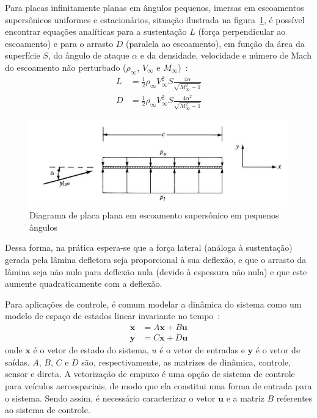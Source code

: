 Para placas infinitamente planas em ângulos pequenos, imersas em escoamentos supersônicos uniformes e estacionários, situação ilustrada na figura~\ref{fig:supersonic_flat_plate}, é possível encontrar equações analíticas para a sustentação \(L\) (força perpendicular ao escoamento) e para o arrasto \(D\) (paralela ao escoamento), em função da área da superfície \(S\), do ângulo de ataque \(\alpha \) e da densidade, velocidade e número de Mach do escoamento não perturbado (\(\rho_\infty \), \(V_\infty \) e \(M_\infty \))~\cite{anderson}:
\begin{align}
    L &= \frac{1}{2} \rho_\infty V_\infty^2 S \frac{4\alpha}{\sqrt{M_\infty^2-1}} \label{eq:sslift} \\
    D &= \frac{1}{2} \rho_\infty V_\infty^2 S \frac{4\alpha^2}{\sqrt{M_\infty^2-1}}
\end{align}

\begin{figure}[htbp]
    \centering
    \includegraphics[width=\textwidth]{img/supersonic_flat_plate.png}
    \caption{Diagrama de placa plana em escoamento supersônico em pequenos ângulos}\label{fig:supersonic_flat_plate}
\end{figure}

Dessa forma, na prática espera-se que a força lateral (análoga à sustentação) gerada pela lâmina defletora seja proporcional à sua deflexão, e que o arrasto da lâmina seja não nulo para deflexão nula (devido à espessura não nula) e que este aumente quadraticamente com a deflexão.

Para aplicações de controle, é comum modelar a dinâmica do sistema como um modelo de espaço de estados linear invariante no tempo~\cite{fbsys}:
\begin{align}
    \dot{\textbf{x}} &= A\textbf{x} + B\textbf{u} \\
    \textbf{y} &= C\textbf{x} + D\textbf{u}
\end{align}
onde \(\textbf{x}\) é o vetor de estado do sistema, \(u\) é o vetor de entradas e \(\textbf{y}\) é o vetor de saídas. \(A\), \(B\), \(C\) e \(D\) são, respectivamente, as matrizes de dinâmica, controle, sensor e direta. A vetorização de empuxo é uma opção de sistema de controle para veículos aeroespaciais, de modo que ela constitui uma forma de entrada para o sistema. Sendo assim, é necessário caracterizar o vetor \(\textbf{u}\) e a matriz \(B\) referentes ao sistema de controle.

